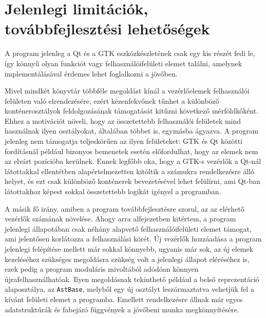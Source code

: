 





\section{Jelenlegi limitációk, továbbfejlesztési lehetőségek}
A program jelenleg a Qt és a GTK eszközkészletének csak egy kis részét fedi le, így könnyű olyan funkciót vagy felhasználóifelületi elemet találni, amelynek implementálásával érdemes lehet foglalkozni a jövőben.

Mivel mindkét könyvtár többféle megoldást kínál a vezérlőelemek felhasználói felületen való elrendezésére, ezért kézenfekvőnek tűnhet a különböző konténerosztályok feldolgozásának támogatását kitűzni következő mérföldkőként. Ehhez a motivációt növeli, hogy az összetettebb felhasználói felületek mind használnak ilyen osztályokat, általában többet is, egymásba ágyazva. A program jelenleg nem támogatja teljeskörűen az ilyen felületeket: GTK és Qt közötti fordításnál például bizonyos bemenetek esetén előfordulhat, hogy az elemek nem az elvárt pozícióba kerülnek. Ennek legfőbb oka, hogy a GTK-s vezérlők a Qt-nál látottakkal ellentétben alapértelmezetten kitöltik a számukra rendelkezésre álló helyet, és ezt csak különböző konténerek bevezetésével lehet felülírni, ami Qt-ban látottakhoz képest sokkal összetettebb logikát igényel a programban.

A másik fő irány, amiben a program továbbfejlesztésre szorul, az az elérhető vezérlők számának növelése. Ahogy arra  alfejezetben kitértem, a program jelenlegi állapotában csak néhány alapvető felhasználóifelületi elemet támogat, ami jelentősen korlátozza a felhasználási körét. Új vezérlők hozzáadása a program jelenlegi felépítése mellett már sokkal könnyebb, ugyanis már sok, az új elemek kezeléséhez szükséges megoldásra szükség volt a jelenlegi állapot eléréséhez is, ezek pedig a program moduláris mivoltából adódóan könnyen újrafelhasználhatóak. Ilyen megoldásnak tekinthető például a belső reprezentáció alaposztálya, az \texttt{AstBase}, melyből egy új osztályt leszármaztatva vehetjük fel a kívánt felületi elemet a programba. Emellett rendelkezésre állnak már egyes adatstruktúrák és fabejáró függvények a jövőbeni munka megkönnyítésére.
